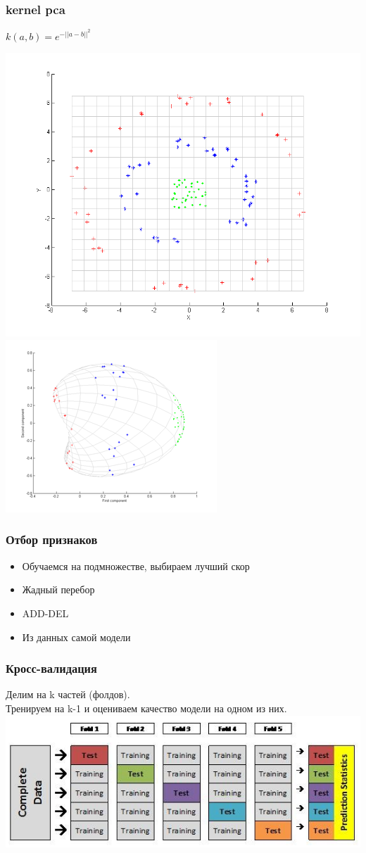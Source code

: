 \documentclass[14pt]{beamer}
\begin{document}
\begin{frame}
\frametitle{kernel pca}
	\begin{center}
		$k(a,b)=e^{-||a-b||^2}$
	\end{center}
	\includegraphics[width=0.5\linewidth]{kerpca1.png}
	\includegraphics[width=0.5\linewidth]{kerpca2.png}
\end{frame}

\begin{frame}
	\frametitle{Отбор признаков}
	\begin{itemize}
			\item Обучаемся на подмножестве, выбираем лучший скор
			\item Жадный перебор
			\item ADD-DEL
			\item Из данных самой модели
	\end{itemize}
\end{frame}

\begin{frame}
	\frametitle{Кросс-валидация}
	Делим на k частей (фолдов).\\
	Тренируем на k-1 и оцениваем качество модели на одном из них.\\[1em]
	\includegraphics[width=\linewidth]{cv.png}
\end{frame}
\end{document}
